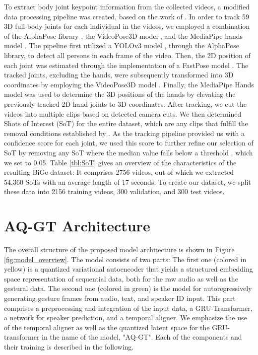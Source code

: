 \documentclass[sigconf]{acmart}
\begin{document}
To extract body joint keypoint information from the collected videos, a modified data processing pipeline was created, based on the work of \citet{yoonRobotsLearnSocial2019a}.
In order to track 59 3D full-body joints for each individual in the videos, we employed a combination of the AlphaPose library \cite{alphapose}, the VideoPose3D model \cite{pavllo20193d}, and the MediaPipe hands model \cite{zhang2020mediapipe}.
The pipeline first utilized a YOLOv3 model \cite{redmon2018yolov3}, through the AlphaPose library, to detect all persons in each frame of the video. Then, the 2D position of each joint was estimated through the implementation of a FastPose model \cite{zhang2019fast}. The tracked joints, excluding the hands, were subsequently transformed into 3D coordinates by employing the VideoPose3D model \cite{pavllo20193d}. Finally, the MediaPipe Hands model was used to determine the 3D positions of the hands by elevating the previously tracked 2D hand joints to 3D coordinates. 
After tracking, we cut the videos into multiple clips based on detected camera cuts. We then determined Shots of Interest (SoT) for the entire dataset, which are any clips that fulfill the removal conditions established by \citet{yoonRobotsLearnSocial2019a}. As the tracking pipeline provided us with a confidence score for each joint, we used this score to further refine our selection of SoT by removing any SoT where the median value falls below a threshold , which we set to 0.05. Table \ref{tbl:SoT} gives an overview of the characteristics of the resulting BiGe dataset: It comprises 2756 videos, out of which we extracted 54.360 SoTs with an average length of 17 seconds. To create our dataset, we split these data into 2156 training videos, 300 validation, and 300 test videos.


\section{AQ-GT Architecture}
The overall structure of the proposed model architecture is shown in Figure \ref{fig:model_overview}. The model consists of two parts: The first one (colored in yellow) is a quantized variational autoencoder that yields a structured embedding space representation of sequential data, both for the raw audio as well as the gestural data. The second one (colored in green) is the model for autoregressively generating gesture frames from audio, text, and speaker ID input. This part comprises a preprocessing and integration of the input data, a GRU-Transformer, a network for speaker prediction, and a temporal aligner. We emphasize the use of the temporal aligner as well as the quantized latent space for the GRU-transformer in the name of the model, "AQ-GT". Each of the components and their training is described in the following.
\end{document}
